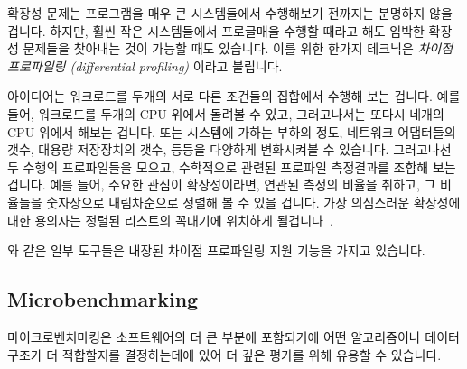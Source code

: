 확장성 문제는 프로그램을 매우 큰 시스템들에서 수행해보기 전까지는 분명하지 않을
겁니다.
하지만, 훨씬 작은 시스템들에서 프로글매을 수행할 때라고 해도 임박한 확장성
문제들을 찾아내는 것이 가능할 때도 있습니다.
이를 위한 한가지 테크닉은 \emph{차이점 프로파일링 (differential profiling)}
이라고 불립니다.

아이디어는 워크로드를 두개의 서로 다른 조건들의 집합에서 수행해 보는 겁니다.
예를들어, 워크로드를 두개의 CPU 위에서 돌려볼 수 있고, 그러고나서는 또다시
네개의 CPU 위에서 해보는 겁니다.
또는 시스템에 가하는 부하의 정도, 네트워크 어댑터들의 갯수, 대용량 저장장치의
갯수, 등등을 다양하게 변화시켜볼 수 있습니다.
그러고나선 두 수행의 프로파일들을 모으고, 수학적으로 관련된 프로파일 측정결과를
조합해 보는 겁니다.
예를 들어, 주요한 관심이 확장성이라면, 연관된 측정의 비율을 취하고, 그 비율들을
숫자상으로 내림차순으로 정렬해 볼 수 있을 겁니다.
가장 의심스러운 확장성에 대한 용의자는 정렬된 리스트의 꼭대기에 위치하게
될겁니다~\cite{McKenney95a,McKenney99b}.

 와 같은 일부 도구들은 내장된 차이점 프로파일링 지원 기능을 가지고
있습니다.

\subsection{Microbenchmarking}
\label{sec:debugging:Microbenchmarking}

마이크로벤치마킹은 소프트웨어의 더 큰 부분에 포함되기에 어떤 알고리즘이나
데이터 구조가 더 적합할지를 결정하는데에 있어 더 깊은 평가를 위해 유용할 수
있습니다.

